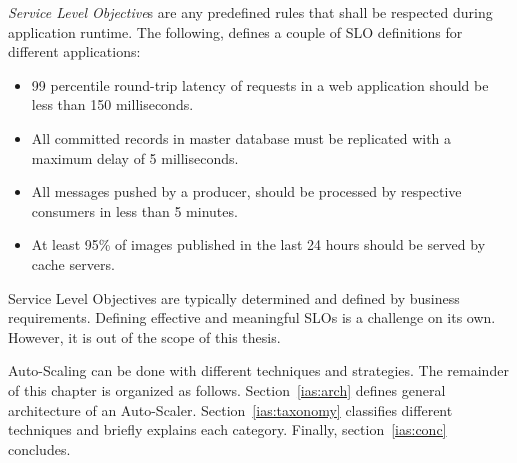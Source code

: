 \emph{Service Level Objective}s are any predefined rules that shall be respected during application runtime. The following, defines a couple of SLO definitions for different applications:
\begin{itemize}
    \item 99 percentile round-trip latency of requests in a web application should be less than 150 milliseconds.
    \item All committed records in master database must be replicated with a maximum delay of 5 milliseconds.
    \item All messages pushed by a producer, should be processed by respective consumers in less than 5 minutes.
    \item At least 95\% of images published in the last 24 hours should be served by cache servers.
\end{itemize}
Service Level Objectives are typically determined and defined by business requirements. Defining effective and meaningful SLOs is a challenge on its own. However, it is out of the scope of this thesis.

Auto-Scaling can be done with different techniques and strategies. The remainder of this chapter is organized as follows. Section~\ref{ias:arch} defines general architecture of an Auto-Scaler. Section~\ref{ias:taxonomy} classifies different techniques and briefly explains each category. Finally, section~\ref{ias:conc} concludes.

